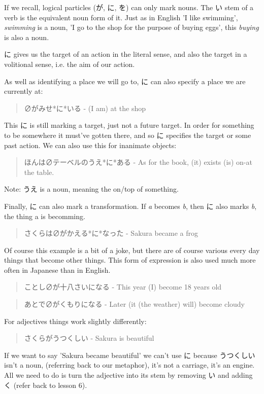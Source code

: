 \documentclass[11pt]{article}
\begin{document}
If we recall, logical particles (が, に, を) can only mark nouns. The い stem of a verb is the equivalent noun form of it. Just as in English 'I like swimming', \emph{swimming} is a noun, 'I go to the shop for the purpose of buying eggs', this \emph{buying} is also a noun.

に gives us the target of an action in the literal sense, and also the target in a volitional sense, i.e. the aim of our action.

As well as identifying a place we will go to, に can also specify a place we are currently at:
\begin{quote}
∅がみせ*に*いる - (I am) at the shop
\end{quote}
This に is still marking a target, just not a future target. In order for something to be somewhere it must've gotten there, and so に specifies the target or some past action. We can also use this for inanimate objects:
\begin{quote}
ほんは∅テーベルのうえ*に*ある - As for the book, (it) exists (is) on-at the table.
\end{quote}
Note: うえ is a noun, meaning the on/top of something.

Finally, に can also mark a transformation. If \emph{a} becomes \emph{b}, then に also marks \emph{b}, the thing a is becomming.
\begin{quote}
さくらは∅がかえる*に*なった - Sakura became a frog
\end{quote}
Of course this example is a bit of a joke, but there are of course various every day things that become other things. This form of expression is also used much more often in Japanese than in English.
\begin{quote}
ことし∅が十八さいになる - This year (I) become 18 years old
\end{quote}
\begin{quote}
あとで∅がくもりになる - Later (it (the weather) will) become cloudy
\end{quote}

For adjectives things work slightly differently:
\begin{quote}
さくらがうつくしい - Sakura is beautiful
\end{quote}
If we want to say 'Sakura became beautiful' we can't use に because うつくしい isn't a noun, (referring back to our metaphor), it's not a carriage, it's an engine. All we need to do is turn the adjective into its stem by removing い and adding く (refer back to lesson 6).
\end{document}
